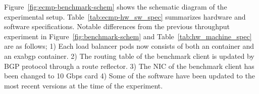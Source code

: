 Figure~\ref{fig:ecmp-benchmark-schem} shows the schematic diagram of the experimental setup. Table~\ref{tab:ecmp-hw_sw_spec} summarizes hardware and software specifications.
Notable differences from the previous throughput experiment in Figure~\ref{fig:benchmark-schem} and Table~\ref{tab:hw_machine_spec} are as follows;
1) Each load balancer pods now consists of both an  container and an exabgp container.
2) The routing table of the benchmark client is updated by BGP protocol through a route reflector.
3) The NIC of the benchmark client has been changed to 10 Gbps card
4) Some of the software have been updated to the most recent versions at the time of the experiment.

\FloatBarrier


